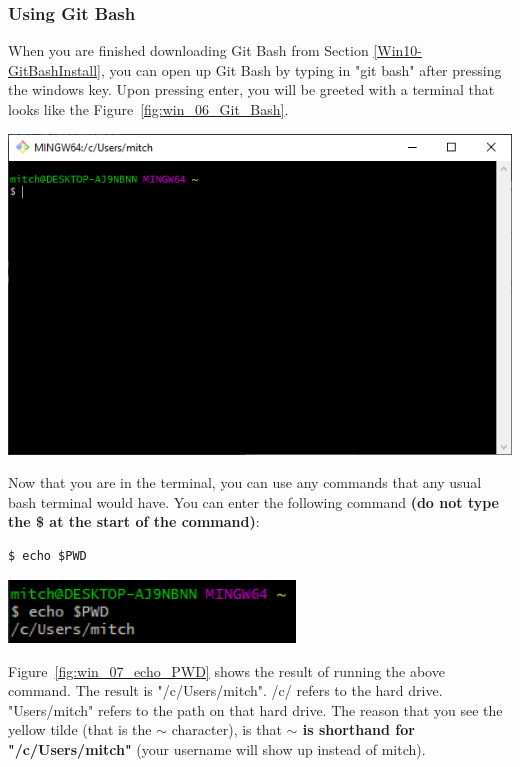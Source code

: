 \documentclass[12pt]{article}
\begin{document}
\subsubsection{Using Git Bash}

When you are finished downloading Git Bash from Section \ref{Win10-GitBashInstall}, you can open up Git Bash by typing in "git bash" after pressing the windows key. Upon pressing enter, you will be greeted with a terminal that looks like the Figure~\ref{fig:win_06_Git_Bash}.

\begin{center}
    \includegraphics[scale=0.6]{win_06_Git_Bash.PNG}
    \label{fig:win_06_Git_Bash}
\end{center}

Now that you are in the terminal, you can use any commands that any usual bash terminal would have. You can enter the following command \textbf{(do not type the \$ at the start of the command)}:

\begin{lstlisting}
$ echo $PWD
\end{lstlisting}

\begin{center}
    \includegraphics[width=3in]{win_07_echo_PWD.PNG}
    \label{fig:win_07_echo_PWD}
\end{center}

Figure~\ref{fig:win_07_echo_PWD} shows the result of running the above command. The result is "/c/Users/mitch". /c/ refers to the hard drive. "Users/mitch" refers to the path on that hard drive. The reason that you see the yellow tilde (that is the $\sim$ character), is that \textbf{$\sim$ is shorthand for "/c/Users/mitch"} (your username will show up instead of mitch).
\end{document}
